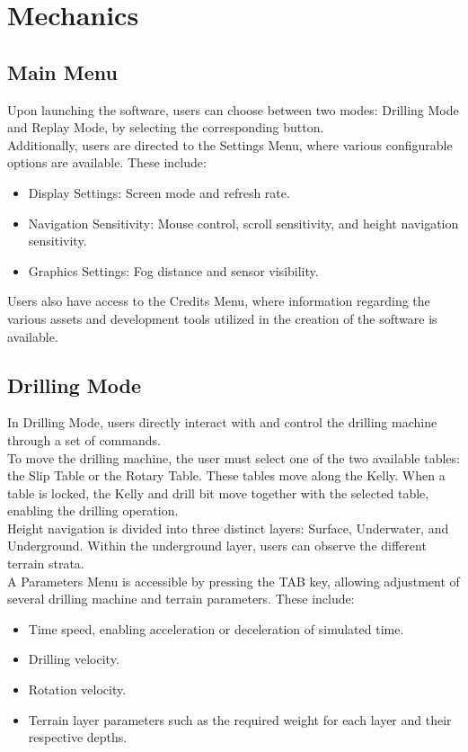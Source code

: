 \documentclass{article}
\begin{document}
\newpage
\section{Mechanics}
\subsection{Main Menu}\hfill

Upon launching the software, users can choose between two modes: Drilling Mode and Replay Mode, by selecting the corresponding button.\\

Additionally, users are directed to the Settings Menu, where various configurable options are available. These include:
\begin{itemize}
    \item Display Settings: Screen mode and refresh rate.
    \item Navigation Sensitivity: Mouse control, scroll sensitivity, and height navigation sensitivity.
    \item Graphics Settings: Fog distance and sensor visibility.
\end{itemize}

Users also have access to the Credits Menu, where information regarding the various assets and development tools utilized in the creation of the software is available.

\subsection{Drilling Mode}\hfill

In Drilling Mode, users directly interact with and control the drilling machine through a set of commands.\\

To move the drilling machine, the user must select one of the two available tables: the Slip Table or the Rotary Table. These tables move along the Kelly. When a table is locked, the Kelly and drill bit move together with the selected table, enabling the drilling operation.\\

Height navigation is divided into three distinct layers: Surface, Underwater, and Underground. Within the underground layer, users can observe the different terrain strata.\\

A Parameters Menu is accessible by pressing the TAB key, allowing adjustment of several drilling machine and terrain parameters. These include:
\begin{itemize}
    \item Time speed, enabling acceleration or deceleration of simulated time.
    \item Drilling velocity.
    \item Rotation velocity.
    \item Terrain layer parameters such as the required weight for each layer and their respective depths.
\end{itemize}
\end{document}
